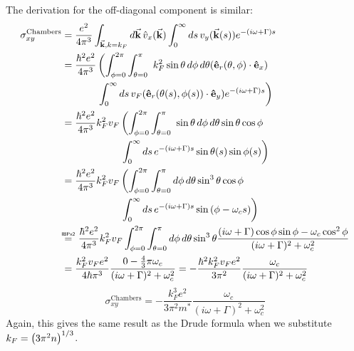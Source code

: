 \documentclass[12pt]{article}
\newcommand\myeq{\mathrel{\overset{\makebox[0pt]{\mbox{\normalfont\tiny\sffamily IBPx2}}}{=}}}
\begin{document}
The derivation for the off-diagonal component is similar:
\begin{align}
	\sigma_{xy}^{\text{Chambers}} &= \frac{e^2}{4\pi^3}\displaystyle\int_{\va{k}, k = k_F}^{}\mathop{d\va{k}} \hat{v}_x(\va{k}) 
		\int_0^{\infty}\mathop{ds} v_y(\va{k}(s)) e^{-(i\omega + \Gamma)s} \\
	&= \begin{aligned}[t] \frac{\hbar^2 e^2}{4\pi^3}&\left(\displaystyle\int_{\phi = 0}^{2\pi}\int_{\theta = 0}^{\pi}\ k_F^2\sin{\theta}\mathop{d\phi}\mathop{d\theta}(\vu{e}_r(\theta, \phi)\cdot \vu{e}_x)\right. \\
		&\left.\int_0^{\infty}\mathop{ds} v_F (\vu{e}_r(\theta(s), \phi(s))\cdot \vu{e}_y) e^{-(i\omega + \Gamma)s}\right) \end{aligned} \\
	&= \begin{aligned}[t] \frac{\hbar^2 e^2}{4\pi^3}k_F^2v_F&\left(\displaystyle\int_{\phi = 0}^{2\pi}\int_{\theta = 0}^{\pi}\ \sin{\theta}\mathop{d\phi}\mathop{d\theta} \sin{\theta}\cos{\phi} \right. \\
		&\left.\int_0^{\infty}\mathop{ds} e^{-(i\omega + \Gamma)s} \sin{\theta(s)}\sin{\phi(s)}\right) \end{aligned} \\
	&= \begin{aligned}[t] \frac{\hbar^2 e^2}{4\pi^3}k_F^2v_F&\left(\displaystyle\int_{\phi = 0}^{2\pi}\int_{\theta = 0}^{\pi} \mathop{d\phi}\mathop{d\theta} \sin^3{\theta}\cos{\phi} \right. \\
		&\left.\int_0^{\infty}\mathop{ds} e^{-(i\omega + \Gamma)s} \sin{(\phi - \omega_c s)}\right) \end{aligned} \\
	&\myeq\ \frac{\hbar^2 e^2}{4\pi^3}k_F^2v_F\displaystyle\int_{\phi = 0}^{2\pi}\int_{\theta = 0}^{\pi} \mathop{d\phi}\mathop{d\theta} \sin^3{\theta}\frac{(i\omega + \Gamma)\cos{\phi}\sin\phi-\omega_c\cos^2\phi}{(i\omega + \Gamma)^2 + \omega_c^2} \\
	&= \frac{k_F^2v_Fe^2}{4\hbar\pi^3}\frac{0 - \frac{4}{3}\pi\omega_c}{(i\omega + \Gamma)^2 + \omega_c^2} = -\frac{\hbar^2 k_F^2v_Fe^2}{3\pi^2}\frac{\omega_c}{(i\omega + \Gamma)^2 + \omega_c^2}
\end{align}
\begin{equation}
	\sigma_{xy}^{\text{Chambers}} = -\frac{k_F^3e^2}{3\pi^2m^*}\frac{\omega_c}{(i\omega + \Gamma)^2 + \omega_c^2}
\end{equation}
Again, this gives the same result as the Drude formula when we substitute $k_F = \qty(3\pi^2n)^{1/3}$.
\appendix
\renewcommand{\thesection}{Appendix}
\end{document}
